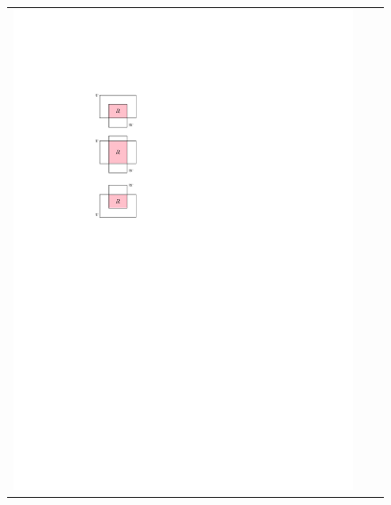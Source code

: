 \documentclass[lotsofwhite]{patmorin}
\begin{document}
\begin{figure}
   \begin{tabular}{ccc}
   \includegraphics{figs/hvo-1} & 

\end{tabular}
\end{figure}
\end{document}
